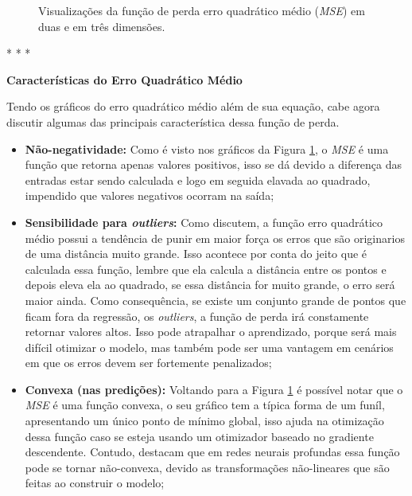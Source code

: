 \begin{figure}[h!]
    \caption{Visualizações da função de perda erro quadrático médio (\textit{MSE}) em duas e em três dimensões.}
    \label{fig:mse} %
\end{figure}

\medskip
\begin{center}
 * * *
\end{center}
\medskip

\textbf{Características do Erro Quadrático Médio}
\vspace{1em}

Tendo os gráficos do erro quadrático médio além de sua equação, cabe agora discutir algumas das principais característica dessa função de perda.

\begin{itemize}
    \item \textbf{Não-negatividade:} Como é visto nos gráficos da Figura \ref{fig:mse}, o \textit{MSE} é uma função que retorna apenas valores positivos, isso se dá devido a diferença das entradas estar sendo calculada e logo em seguida elavada ao quadrado, impendido que valores negativos ocorram na saída;
    \item \textbf{Sensibilidade para \textit{outliers}:} Como \textcite{LossesArticle} discutem, a função erro quadrático médio possui a tendência de punir em maior força os erros que são originarios de uma distância muito grande. Isso acontece por conta do jeito que é calculada essa função, lembre que ela calcula a distância entre os pontos e depois eleva ela ao quadrado, se essa distância for muito grande, o erro será maior ainda. Como consequência, se existe um conjunto grande de pontos que ficam fora da regressão, os \textit{outliers}, a função de perda irá constamente retornar valores altos. Isso pode atrapalhar o aprendizado, porque será mais difícil otimizar o modelo, mas também pode ser uma vantagem em cenários em que os erros devem ser fortemente penalizados;
    \item \textbf{Convexa (nas predições):} Voltando para a Figura \ref{fig:mse} é possível notar que o \textit{MSE} é uma função convexa, o seu gráfico tem a típica forma de um funíl, apresentando um único ponto de mínimo global, isso ajuda na otimização dessa função caso se esteja usando um otimizador baseado no gradiente descendente. Contudo, \textcite{LossesArticle} destacam que em redes neurais profundas essa função pode se tornar não-convexa, devido as transformações não-lineares que são feitas ao construir o modelo;

\end{itemize}
